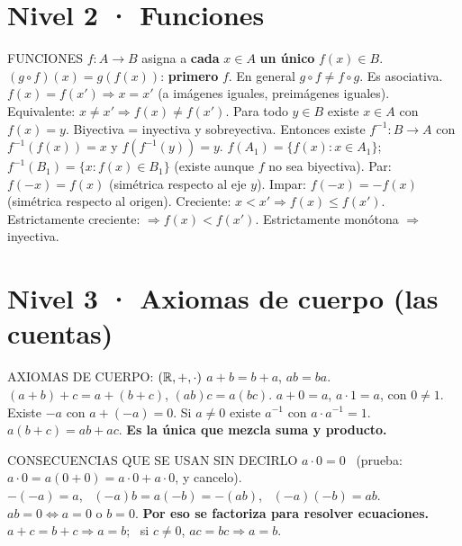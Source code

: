 \section*{Nivel 2 · Funciones}
\begin{sello}{FUNCIONES}
 $f:A\to B$ asigna a \textbf{cada} $x\in A$ \textbf{un único} $f(x)\in B$.
 $(g\circ f)(x)=g(f(x))$: \textbf{primero} $f$. En general $g\circ f\neq f\circ g$. Es asociativa.
 $f(x)=f(x')\Rightarrow x=x'$ (a imágenes iguales, preimágenes iguales). Equivalente: $x\neq x'\Rightarrow f(x)\neq f(x')$.
 Para todo $y\in B$ existe $x\in A$ con $f(x)=y$.
 Biyectiva = inyectiva y sobreyectiva. Entonces existe $f^{-1}:B\to A$ con $f^{-1}(f(x))=x$ y $f(f^{-1}(y))=y$.
 $f(A_1)=\{f(x):x\in A_1\}$; \ $f^{-1}(B_1)=\{x:f(x)\in B_1\}$ (existe aunque $f$ no sea biyectiva).
 Par: $f(-x)=f(x)$ (simétrica respecto al eje $y$). Impar: $f(-x)=-f(x)$ (simétrica respecto al origen).
 Creciente: $x<x'\Rightarrow f(x)\le f(x')$. Estrictamente creciente: $\Rightarrow f(x)<f(x')$. Estrictamente monótona $\Rightarrow$ inyectiva.
\end{sello}

\section*{Nivel 3 · Axiomas de cuerpo (las cuentas)}
\begin{sello}{AXIOMAS DE CUERPO: $(\mathbb{R},+,\cdot)$}
 $a+b=b+a$, \quad $ab=ba$.
 $(a+b)+c=a+(b+c)$, \quad $(ab)c=a(bc)$.
 $a+0=a$, \quad $a\cdot1=a$, con $0\neq1$.
 Existe $-a$ con $a+(-a)=0$. Si $a\neq0$ existe $a^{-1}$ con $a\cdot a^{-1}=1$.
 $a(b+c)=ab+ac$. \textbf{Es la única que mezcla suma y producto.}
\end{sello}
\begin{memo}{CONSECUENCIAS QUE SE USAN SIN DECIRLO}
 $a\cdot0=0$ \ (prueba: $a\cdot0=a(0+0)=a\cdot0+a\cdot0$, y cancelo).\\
 $-(-a)=a$, \ $(-a)b=a(-b)=-(ab)$, \ $(-a)(-b)=ab$.\\
 $ab=0\iff a=0$ o $b=0$. \textbf{Por eso se factoriza para resolver ecuaciones.}\\
 $a+c=b+c\Rightarrow a=b$; \ si $c\neq0$, $ac=bc\Rightarrow a=b$.
\end{memo}

